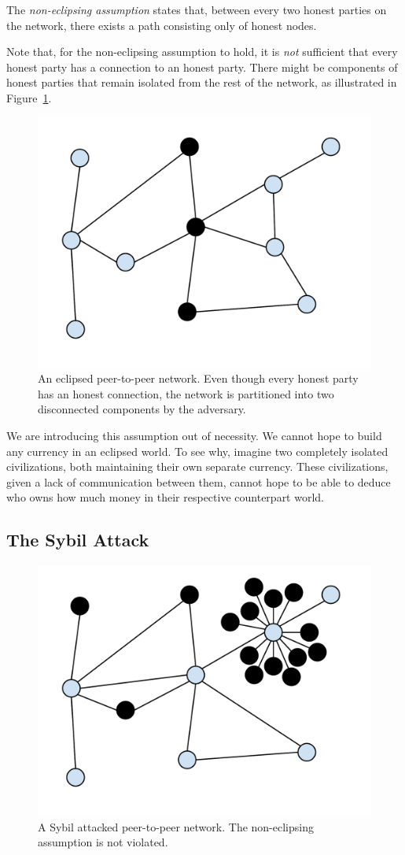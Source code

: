 \begin{definition}
  The \emph{non-eclipsing assumption} states that,
  between every two honest parties on the network, there exists a path consisting only of honest nodes.
\end{definition}

Note that, for the non-eclipsing assumption to hold, it is \emph{not} sufficient that every honest party
has a connection to an honest party. There might be components of honest parties that remain
isolated from the rest of the network, as illustrated in Figure~\ref{fig.eclipsing}.

\begin{figure}[h]
    \centering
    \includegraphics[width=0.5 \columnwidth,keepaspectratio]{figures/eclipsed-peer-to-peer-network.pdf}
    \caption{An eclipsed peer-to-peer network. Even though every honest party has an honest connection,
    the network is partitioned into two disconnected components by the adversary.}
    \label{fig.eclipsing}
\end{figure}

We are introducing this assumption out of necessity. We cannot hope to build any currency
in an eclipsed world. To see why, imagine two completely isolated civilizations, both maintaining
their own separate currency. These civilizations, given a lack of communication between them, cannot
hope to be able to deduce who owns how much money in their respective counterpart world.

\subsection*{The Sybil Attack}

\begin{figure}[h]
    \centering
    \includegraphics[width=0.5 \columnwidth,keepaspectratio]{figures/sybil-attack.pdf}
    \caption{A Sybil attacked peer-to-peer network. The non-eclipsing assumption is not violated.}
    \label{fig.sybil}
\end{figure}

